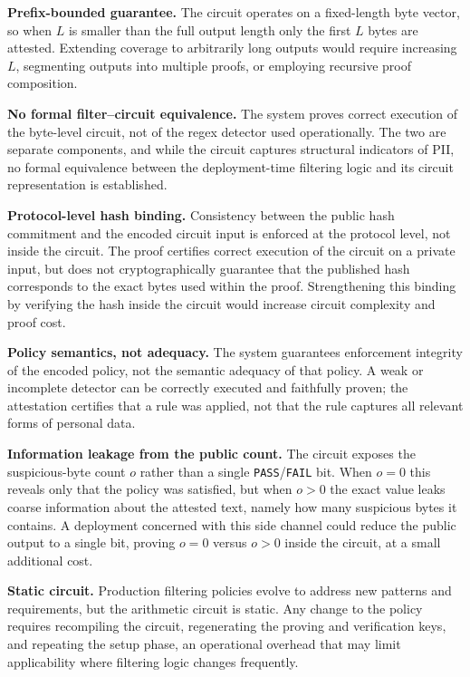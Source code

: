 \medskip

\textbf{Prefix-bounded guarantee.} The circuit operates on a fixed-length byte vector, so when $L$ is smaller than the full output length only the first $L$ bytes are attested. Extending coverage to arbitrarily long outputs would require increasing $L$, segmenting outputs into multiple proofs, or employing recursive proof composition.

\medskip

\textbf{No formal filter--circuit equivalence.} The system proves correct execution of the byte-level circuit, not of the regex detector used operationally. The two are separate components, and while the circuit captures structural indicators of PII, no formal equivalence between the deployment-time filtering logic and its circuit representation is established.

\medskip

\textbf{Protocol-level hash binding.} Consistency between the public hash commitment and the encoded circuit input is enforced at the protocol level, not inside the circuit. The proof certifies correct execution of the circuit on a private input, but does not cryptographically guarantee that the published hash corresponds to the exact bytes used within the proof. Strengthening this binding by verifying the hash inside the circuit would increase circuit complexity and proof cost.

\medskip

\textbf{Policy semantics, not adequacy.} The system guarantees enforcement integrity of the encoded policy, not the semantic adequacy of that policy. A weak or incomplete detector can be correctly executed and faithfully proven; the attestation certifies that a rule was applied, not that the rule captures all relevant forms of personal data.

\medskip

\textbf{Information leakage from the public count.} The circuit exposes the suspicious-byte count $o$ rather than a single \texttt{PASS}/\texttt{FAIL} bit. When $o = 0$ this reveals only that the policy was satisfied, but when $o > 0$ the exact value leaks coarse information about the attested text, namely how many suspicious bytes it contains. A deployment concerned with this side channel could reduce the public output to a single bit, proving $o = 0$ versus $o > 0$ inside the circuit, at a small additional cost.

\medskip

\textbf{Static circuit.} Production filtering policies evolve to address new patterns and requirements, but the arithmetic circuit is static. Any change to the policy requires recompiling the circuit, regenerating the proving and verification keys, and repeating the setup phase, an operational overhead that may limit applicability where filtering logic changes frequently.

